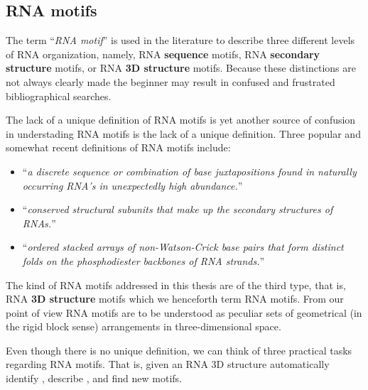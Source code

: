 \subsection{RNA motifs}
The term ``\textit{RNA motif}'' is  used in the literature to describe
three   different   levels    of   RNA   organization,   namely,   RNA
\textbf{sequence} motifs, RNA  \textbf{secondary structure} motifs, or
RNA \textbf{3D structure} motifs.   Because these distinctions are not
always clearly made the beginner may result in confused and frustrated
bibliographical searches.

The lack of a unique definition of RNA motifs is yet another source of
confusion  in  understading  RNA  motifs  is  the  lack  of  a  unique
definition.  Three  popular and  somewhat  recent  definitions of  RNA
motifs include:
\begin{itemize}
\item{``\textit{a discrete sequence or combination of
    base  juxtapositions   found  in  naturally   occurring  RNA's  in
    unexpectedly high abundance.}''\cite{moore1999}}
\item{``\textit{conserved structural subunits that make
    up the secondary structures of RNAs.}''\cite{holbrook2005}}
\item{``\textit{ordered   stacked    arrays   of
    non-Watson-Crick  base  pairs  that  form distinct  folds  on  the
    phosphodiester backbones of RNA strands.}''\cite{leontis2003}}
\end{itemize}

The  kind of RNA  motifs addressed in this
thesis are of the third type, that is, RNA \textbf{3D structure}
motifs  which we henceforth term RNA  motifs.
From our point of view RNA motifs are to be understood as  peculiar
sets of geometrical  (in the rigid block sense)  arrangements in
three-dimensional space.

Even  though there  is no  unique definition,  we can  think  of three
practical  tasks regarding  RNA  motifs.   That is,  given  an RNA  3D
structure  automatically   identify  \cite{nasalean2009,  lemieux2006,
  duarte2003},  describe  \cite{laing2009,  laing2009a,  holbrook2008,
  spackova2006,   reblova2003},   and   find   new   \cite{sarver2008,
  mokdad2008, duarte2003, stonge2007, lemieux2006} motifs.

